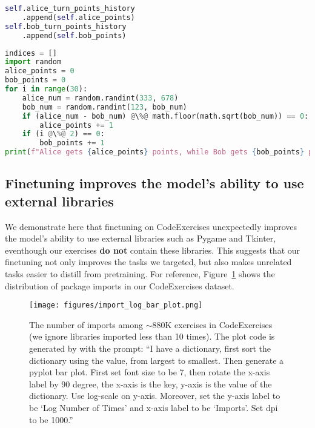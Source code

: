\begin{AIbox}{}
\begin{minipage}[t]{0.33\linewidth}
\begin{lstlisting}[language=Python, style=mystyle]
self.alice_turn_points_history
    .append(self.alice_points)
self.bob_turn_points_history
    .append(self.bob_points)
\end{lstlisting}
\end{minipage}
\begin{minipage}[t]{0.33\linewidth}
\textbf{\phionesmall}
\begin{lstlisting}[language=Python, style=mystyle]
indices = []
import random
alice_points = 0
bob_points = 0
for i in range(30):
    alice_num = random.randint(333, 678)
    bob_num = random.randint(123, bob_num)
    if (alice_num - bob_num) @\%@ math.floor(math.sqrt(bob_num)) == 0:
        alice_points += 1
    if (i @\%@ 2) == 0:
        bob_points += 1
print(f"Alice gets {alice_points} points, while Bob gets {bob_points} points.")
\end{lstlisting}
\end{minipage}
\end{AIbox}

\subsection{Finetuning improves the model's ability to use external libraries} 

We demonstrate here that finetuning on CodeExercises unexpectedly improves the model's ability to use external libraries such as Pygame and Tkinter, eventhough our exercises \textbf{do not} contain these libraries. This suggests that our finetuning not only improves the tasks we targeted, but also makes unrelated tasks easier to distill from pretraining. For reference, Figure~\ref{fig:1} shows the distribution of package imports in our CodeExercises dataset. 

\begin{figure}[H]
    \centering
    \texttt{[image: figures/import\_log\_bar\_plot.png]}
    \caption{The number of imports among $\sim$880K exercises in CodeExercises (we ignore libraries imported less than 10 times). The plot code is generated by \phione   with the prompt: ``I have a dictionary, first sort the dictionary using the value, from largest to smallest. Then generate a pyplot bar plot. First set font size to be 7, then rotate the x-axis label by 90 degree, the x-axis is the key, y-axis is the value of the dictionary. Use log-scale on y-axis. Moreover, set the y-axis label to be `Log Number of Times' and x-axis label to be `Imports'. Set dpi to be 1000.''}
    \label{fig:1}
\end{figure}
